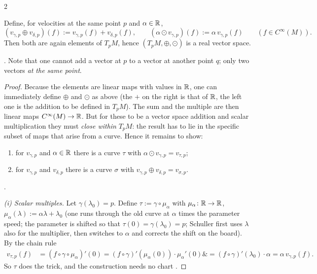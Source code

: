 \begin{paracol}{2}
\begin{theorem}\label{thm:c05-vs}
Define, for velocities at the same point $p$ and $\alpha\in\mathbb{R}$,
\[
  (v_{\gamma,p}\oplus v_{\delta,p})(f):=v_{\gamma,p}(f)+v_{\delta,p}(f),\qquad(\alpha\odot v_{\gamma,p})(f):=\alpha\,v_{\gamma,p}(f)\qquad(f\in C^\infty(M)).
\]
Then both are again elements of $T_pM$, hence $(T_pM,\oplus,\odot)$ is a real vector space.
\end{theorem}
. Note that one cannot add a vector at $p$ to a vector at another point $q$; only two vectors \emph{at the same point}.
\begin{proof}
Because the elements are linear maps with values in $\mathbb{R}$, one can immediately define $\oplus$ and $\odot$ as above (the $+$ on the right is that of $\mathbb{R}$, the left one is the addition to be defined in $T_pM$). The sum and the multiple are then linear maps $C^\infty(M)\to\mathbb{R}$. But for these to be a vector space addition and scalar multiplication
they must \emph{close within} $T_pM$: the result has to lie in the specific subset of maps that arise from a curve. Hence it remains to show:
\begin{enumerate}
  \item for $v_{\gamma,p}$ and $\alpha\in\mathbb{R}$ there is a curve $\tau$ with $\alpha\odot v_{\gamma,p}=v_{\tau,p}$;
  \item for $v_{\gamma,p}$ and $v_{\delta,p}$ there is a curve $\sigma$ with $v_{\gamma,p}\oplus v_{\delta,p}=v_{\sigma,p}$.
\end{enumerate}
.

\emph{(i) Scalar multiples.} Let $\gamma(\lambda_0)=p$. Define $\tau:=\gamma\circ\mu_\alpha$ with $\mu_\alpha\colon\mathbb{R}\to\mathbb{R}$, $\mu_\alpha(\lambda):=\alpha\lambda+\lambda_0$ (one runs through the old curve at $\alpha$ times the parameter speed; the parameter is shifted so that $\tau(0)=\gamma(\lambda_0)=p$; Schuller first uses $\lambda$ also for the
multiplier, then switches to $\alpha$ and corrects the shift on the board). By the chain rule
\[
  \begin{aligned}v_{\tau,p}(f)&=(f\circ\gamma\circ\mu_\alpha)'(0)=(f\circ\gamma)'(\mu_\alpha(0))\cdot\mu_\alpha'(0)\&=(f\circ\gamma)'(\lambda_0)\cdot\alpha=\alpha\,v_{\gamma,p}(f).\end{aligned}
\]
So $\tau$ does the trick, and the construction needs no chart .


\end{proof}
\end{paracol}
